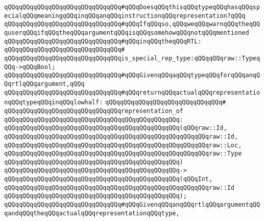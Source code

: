 \newline
\verb|qQQqqQQqqQQqqQQqqQQqqQQqqQQqqQQq#qQQqDoesqQQqthisqQQqtypeqQQqhasqQQqspecialqQQqmeaningqQQqinqQQqanqQQqinstructionqQQqrepresentation?qQQq|\newline
\verb|qQQqqQQqqQQqqQQqqQQqqQQqqQQqqQQq#qQQqIfqQQqso,qQQqweqQQqwarnqQQqtheqQQquserqQQqifqQQqtheqQQqargumentqQQqisqQQqsomehowqQQqnotqQQqmentioned|\newline
\verb|qQQqqQQqqQQqqQQqqQQqqQQqqQQqqQQq#qQQqinqQQqtheqQQqRTL:|\newline
\verb|qQQqqQQqqQQqqQQqqQQqqQQqqQQqqQQq#|\newline
\verb|qQQqqQQqqQQqqQQqqQQqqQQqqQQqqQQqis_special_rep_type:qQQqqQQqraw::TypeqQQq->qQQqBool;|\newline
\newline
\newline
\verb|qQQqqQQqqQQqqQQqqQQqqQQqqQQqqQQq#qQQqGivenqQQqaqQQqtypeqQQqforqQQqanqQQqrtlqQQqargument,qQQq|\newline
\verb|qQQqqQQqqQQqqQQqqQQqqQQqqQQqqQQq#qQQqreturnqQQqactualqQQqrepresentationqQQqtypeqQQqinqQQqlowhalf:|\newline
\verb|qQQqqQQqqQQqqQQqqQQqqQQqqQQqqQQq#|\newline
\verb|qQQqqQQqqQQqqQQqqQQqqQQqqQQqqQQqrepresentation_of|\newline
\verb|qQQqqQQqqQQqqQQqqQQqqQQqqQQqqQQqqQQqqQQqqQQqqQQq:|\newline
\verb|qQQqqQQqqQQqqQQqqQQqqQQqqQQqqQQqqQQqqQQqqQQqqQQq(qQQqraw::Id,|\newline
\verb|qQQqqQQqqQQqqQQqqQQqqQQqqQQqqQQqqQQqqQQqqQQqqQQqqQQqqQQqraw::Id,|\newline
\verb|qQQqqQQqqQQqqQQqqQQqqQQqqQQqqQQqqQQqqQQqqQQqqQQqqQQqqQQqraw::Loc,|\newline
\verb|qQQqqQQqqQQqqQQqqQQqqQQqqQQqqQQqqQQqqQQqqQQqqQQqqQQqqQQqraw::Type|\newline
\verb|qQQqqQQqqQQqqQQqqQQqqQQqqQQqqQQqqQQqqQQqqQQqqQQq)|\newline
\verb|qQQqqQQqqQQqqQQqqQQqqQQqqQQqqQQqqQQqqQQqqQQqqQQq->|\newline
\verb|qQQqqQQqqQQqqQQqqQQqqQQqqQQqqQQqqQQqqQQqqQQqqQQq(qQQqInt,|\newline
\verb|qQQqqQQqqQQqqQQqqQQqqQQqqQQqqQQqqQQqqQQqqQQqqQQqqQQqqQQqraw::Id|\newline
\verb|qQQqqQQqqQQqqQQqqQQqqQQqqQQqqQQqqQQqqQQqqQQqqQQq);|\newline
\newline
\newline
\verb|qQQqqQQqqQQqqQQqqQQqqQQqqQQqqQQq#qQQqGivenqQQqanqQQqrtlqQQqargumentqQQqandqQQqtheqQQqactualqQQqrepresentationqQQqtype,|\newline
